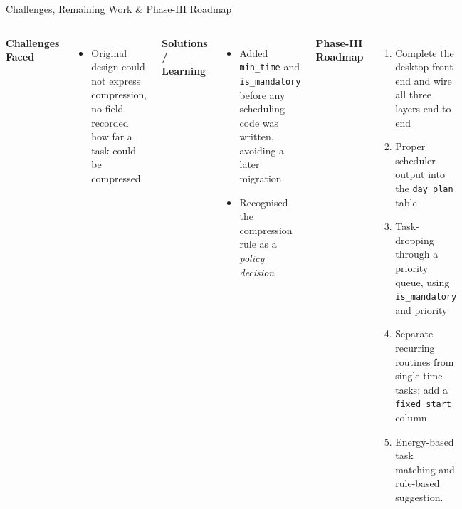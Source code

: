\documentclass[aspectratio=169,11pt]{beamer}
\begin{document}
\begin{frame}{Challenges, Remaining Work \& Phase-III Roadmap}

\begin{columns}[T,totalwidth=\textwidth]


\textbf{\color{GEUBlue}Challenges Faced}

\begin{itemize}\itemsep2pt
\scriptsize
\item  Original design could not express compression, no field recorded how far a task could be compressed
\end{itemize}

\vspace{1mm}

\textbf{\color{GEUBlue}Solutions / Learning}

\begin{itemize}\itemsep
\scriptsize
\item Added \texttt{min\_time} and \texttt{is\_mandatory} before any scheduling
      code was written, avoiding a later migration
\item Recognised the compression rule as a \emph{policy decision}
\end{itemize}


\textbf{\color{GEUBlue}Phase-III Roadmap}

\begin{enumerate}\itemsep
\scriptsize
\item Complete the desktop front end and wire all three layers end to end
\item Proper scheduler output into the \texttt{day\_plan} table
\item Task-dropping through a priority queue, using \texttt{is\_mandatory} and
      priority
\item Separate recurring routines from single time tasks; add a
      \texttt{fixed\_start} column
\item Energy-based task matching and rule-based suggestion.
\end{enumerate}

\end{columns}

\vfill


\end{frame}
\end{document}
